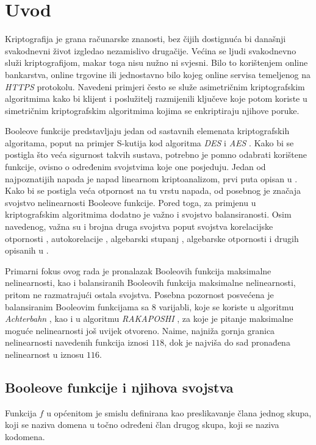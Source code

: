 \chapter{Uvod}
Kriptografija je grana računarske znanosti, bez čijih dostignuća bi današnji svakodnevni život izgledao nezamislivo drugačije.
Većina se ljudi svakodnevno služi kriptografijom, makar toga nisu nužno ni svjesni.
Bilo to korištenjem online bankarstva, online trgovine ili jednostavno bilo kojeg online servisa temeljenog na \textit{HTTPS} protokolu.
Navedeni primjeri često se služe asimetričnim kriptografskim algoritmima kako bi klijent i poslužitelj razmijenili ključeve koje potom koriste u simetričnim kriptografskim algoritmima kojima se enkriptiraju njihove poruke.

Booleove funkcije predstavljaju jedan od sastavnih elemenata kriptografskih algoritama, poput na primjer S-kutija kod algoritma \textit{DES} i \textit{AES} \cite{daemen1999aes}.
Kako bi se postigla što veća sigurnost takvih sustava, potrebno je pomno odabrati korištene funkcije, ovisno o određenim svojstvima koje one posjeduju.
Jedan od najpoznatijih napada je napad linearnom kriptoanalizom, prvi puta opisan u \cite{golic1994linear}.
Kako bi se postigla veća otpornost na tu vrstu napada, od posebnog je značaja svojstvo nelinearnosti Booleove funkcije.
Pored toga, za primjenu u kriptografskim algoritmima dodatno je važno i svojstvo balansiranosti.
Osim navedenog, važna su i brojna druga svojstva poput svojstva korelacijske otpornosti , autokorelacije , algebarski stupanj , algebarske otpornosti  i drugih opisanih u \cite{CryptographicBooleanFunctions}.

Primarni fokus ovog rada je pronalazak Booleovih funkcija maksimalne nelinearnosti, kao i balansiranih Booleovih funkcija maksimalne nelinearnosti, pritom ne razmatrajući ostala svojstva.
Posebna pozornost posvećena je balansiranim Booleovim funkcijama sa $8$ varijabli, koje se koriste u algoritmu \textit{Achterbahn} \cite{gammel2005achterbahn}, kao i u algoritmu \textit{RAKAPOSHI} \cite{cid2009rakaposhi}, za koje je pitanje maksimalne moguće nelinearnosti još uvijek otvoreno.
Naime, najniža gornja granica nelinearnosti navedenih funkcija iznosi $118$, dok je najviša do sad pronađena nelinearnost u iznosu $116$.

\section{Booleove funkcije i njihova svojstva}
Funkcija $f$ u općenitom je smislu definirana kao preslikavanje člana jednog skupa, koji se naziva domena u točno određeni član drugog skupa, koji se naziva kodomena.

